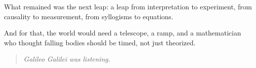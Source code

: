 What remained was the next leap: a leap from interpretation to experiment, from causality to measurement, from syllogisms to equations.

And for that, the world would need a telescope, a ramp, and a mathematician who thought falling bodies should be timed, not just theorized.

\begin{quote}
    \textit{Galileo Galilei was listening.}
\end{quote}

